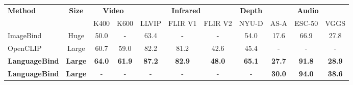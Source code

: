 \documentclass{article} \usepackage{iclr2024_conference,times}
\begin{document}
\begin{table}[htbp]
\setlength\tabcolsep{1.2mm}
    \small
\centering
    \begin{tabular}{l|c|cc|ccc|c|ccc}

        \toprule
        \multirow{2}{*}{\bf{Method}} & \multirow{2}{*}{\bf{Size}} & \multicolumn{2}{c|}{\bf{Video}} & \multicolumn{3}{c|}{\bf{Infrared}} & \multicolumn{1}{c|}{\bf{Depth}} & \multicolumn{3}{c}{\bf{Audio}} \\
         &  & K400 & K600 & LLVIP & FLIR V1  & FLIR V2 & NYU-D & AS-A & ESC-50 & VGGS \\
        \midrule
ImageBind & Huge & 50.0 & - & 63.4 & - & - & 54.0 & 17.6 & 66.9 & 27.8 \\
        OpenCLIP & Large & 60.7 & 59.0 & 82.2 & 81.2 & 42.6 & 45.4 & - & - & - \\
        \bf{LanguageBind} & \bf{Large} & \bf{64.0} & \bf{61.9} & \bf{87.2} & \bf{82.9} & \bf{48.0} & \bf{65.1} & \bf{27.7} & \bf{91.8} & \bf{28.9} \\
        \bf{LanguageBind} & \bf{Large} & - & - & - & - & - & -& \bf{30.0} & \bf{94.0} & \bf{38.6} \\
\bottomrule
        
    \end{tabular}
    \label{tab:depth_and_infrared}
\vspace{-0.2cm}
\end{table}
\end{document}
